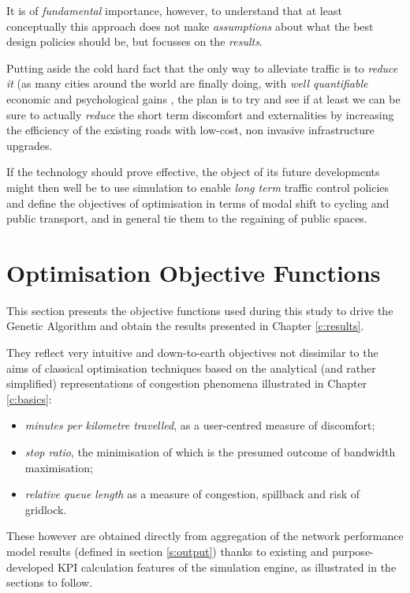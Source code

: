 It is of \emph{fundamental} importance, however, to understand that at least conceptually this approach does not make \emph{assumptions} about what the best design policies should be, but focusses on the \emph{results}.

Putting aside the cold hard fact that the only way to alleviate traffic is to \emph{reduce it} (as many cities around the world are finally doing, with \emph{well quantifiable} economic and psychological gains \citep{flusche2012bicycling}, the plan is to try and see if at least we can be sure to actually \emph{reduce} the short term discomfort and externalities by increasing the efficiency of the existing roads with low-cost, non invasive infrastructure upgrades.

If the technology should prove effective, the object of its future developments might then well be to use simulation to enable \emph{long term} traffic control policies and define the objectives of optimisation in terms of modal shift to cycling and public transport, and in general tie them to the regaining of public spaces.

\section{Optimisation Objective Functions}

This section presents the objective functions used during this study to drive the Genetic Algorithm and obtain the results presented in Chapter \ref{c:results}.

They reflect very intuitive and down-to-earth objectives not dissimilar to the aims of classical optimisation techniques based on the analytical (and rather simplified) representations of congestion phenomena illustrated in Chapter \ref{c:basics}:
\begin{itemize}
\item \emph{minutes per kilometre travelled}, as a user-centred measure of discomfort;
\item \emph{stop ratio}, the minimisation of which is the presumed outcome of bandwidth maximisation;
\item \emph{relative queue length} as a measure of congestion, spillback and risk of gridlock.
\end{itemize}
These however are obtained directly from aggregation of the network performance model results (defined in section \ref{s:output}) thanks to existing and purpose-developed KPI calculation features of the simulation engine, as illustrated in the sections to follow.

